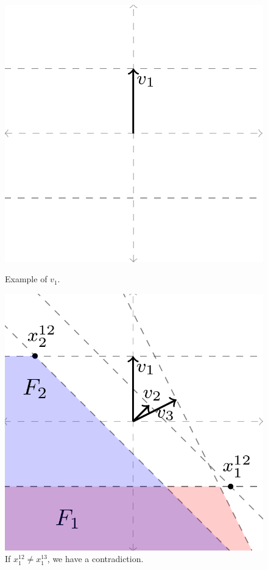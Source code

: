 \documentclass[final]{colt2020} %
\begin{document}
\begin{figure}
	\begin{minipage}{0.45\linewidth}
		\centering
		\includegraphics[width=0.9\linewidth]{tikz/v1}
		\caption{Example of $v_1$.}
		\label{fig:v1}
	\end{minipage}
	\hfill
	\begin{minipage}{0.45\linewidth}
		\centering
		\includegraphics[width=0.9\linewidth]{tikz/qp-must-intersect-line-same-spot}
		\caption{If $x^{12}_1 \neq x^{13}_1$, we have a contradiction.}
		\label{fig:qp-must-intersect-line-same-spot}
	\end{minipage}
\end{figure}
\end{document}
